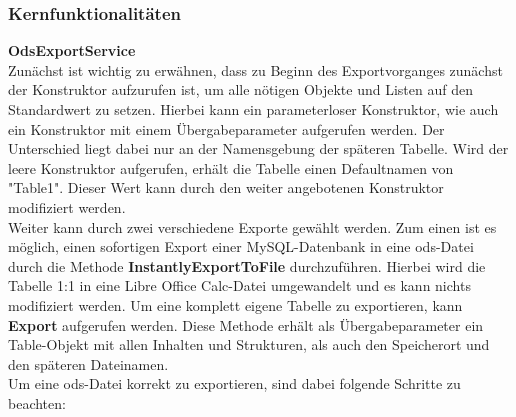 \subsubsection{Kernfunktionalitäten}
\label{loCore}
\textbf{OdsExportService}\\
Zunächst ist wichtig zu erwähnen, dass zu Beginn des Exportvorganges zunächst der Konstruktor aufzurufen ist, um alle nötigen Objekte und Listen auf den Standardwert zu setzen. Hierbei kann ein parameterloser Konstruktor, wie auch ein Konstruktor mit einem Übergabeparameter aufgerufen werden. Der Unterschied liegt dabei nur an der Namensgebung der späteren Tabelle. Wird der leere Konstruktor aufgerufen, erhält die Tabelle einen Defaultnamen von "Table1". Dieser Wert kann durch den weiter angebotenen Konstruktor modifiziert werden.\\
Weiter kann durch zwei verschiedene Exporte gewählt werden. Zum einen ist es möglich, einen sofortigen Export einer MySQL-Datenbank in eine ods-Datei durch die Methode \textbf{InstantlyExportToFile} durchzuführen. Hierbei wird die Tabelle 1:1 in eine Libre Office Calc-Datei umgewandelt und es kann nichts modifiziert werden. Um eine komplett eigene Tabelle zu exportieren, kann \textbf{Export} aufgerufen werden. Diese Methode erhält als Übergabeparameter ein Table-Objekt mit allen Inhalten und Strukturen, als auch den Speicherort und den späteren Dateinamen.\\
Um eine ods-Datei korrekt zu exportieren, sind dabei folgende Schritte zu beachten:

